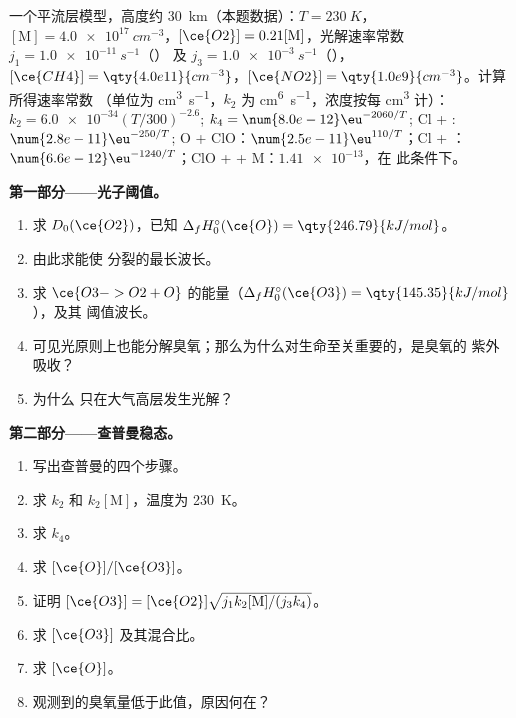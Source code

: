 \begin{problem}
\label{pb:b3:photochemistry:1}
一个平流层模型，高度约 \qty{30}{km}（本题数据）：$T = \qty{230}{K}$，$[\mathrm M] =
\qty{4.0e17}{cm^{-3}}$，$[\ce{O2}] = 0.21[\mathrm M]$，光解速率常数 $j_1 = \qty{1.0e-11}{s^{-1}}$（）
及 $j_3 = \qty{1.0e-3}{s^{-1}}$（），$[\ce{CH4}] = \qty{4.0e11}{cm^{-3}}$，$[\ce{NO2}] = \qty{1.0e9}{cm^{-3}}$。计算所得速率常数
（单位为 \unit{cm^3.s^{-1}}，$k_2$ 为 \unit{cm^6.s^{-1}}，浓度按每 \unit{cm^3} 计）：
$k_2 = \num{6.0e-34}(T/300)^{-2.6}$; $k_4 = \num{8.0e-12}\eu^{-2060/T}$; Cl + : $\num{2.8e-11}\eu^{-250/T}$;
O + ClO：$\num{2.5e-11}\eu^{110/T}$；Cl + ：$\num{6.6e-12}\eu^{-1240/T}$；ClO +  + M：$\num{1.41e-13}$，在
此条件下。

\medskip\noindent\textbf{第一部分——光子阈值。}
\begin{enumerate}
  \item 求 $D_0(\ce{O2})$，已知 $\Delta_fH^\circ_0(\ce{O}) = \qty{246.79}{kJ/mol}$。
  \item 由此求能使  分裂的最长波长。
  \item 求 $\ce{O3 -> O2 + O}$ 的能量（$\Delta_fH^\circ_0(\ce{O3}) = \qty{145.35}{kJ/mol}$），及其
        阈值波长。
  \item 可见光原则上也能分解臭氧；那么为什么对生命至关重要的，是臭氧的
        紫外吸收？
  \item 为什么  只在大气高层发生光解？
\end{enumerate}

\medskip\noindent\textbf{第二部分——查普曼稳态。}
\begin{enumerate}[resume]
  \item 写出查普曼的四个步骤。
  \item 求 $k_2$ 和 $k_2[\mathrm M]$，温度为 \qty{230}{K}。
  \item 求 $k_4$。
  \item 求 $[\ce{O}]/[\ce{O3}]$。
  \item 证明 $[\ce{O3}] = [\ce{O2}]\sqrt{j_1k_2[\mathrm M]/(j_3k_4)}$。
  \item 求 $[\ce{O3}]$ 及其混合比。
  \item 求 $[\ce{O}]$。
  \item 观测到的臭氧量低于此值，原因何在？
\end{enumerate}


\end{problem}
